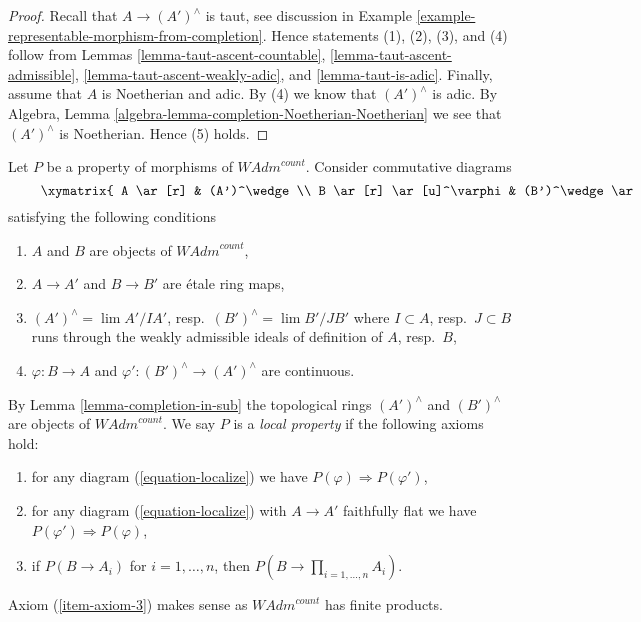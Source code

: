 \begin{proof}
Recall that $A \to (A')^\wedge$ is taut, see discussion in
Example \ref{example-representable-morphism-from-completion}.
Hence statements (1), (2), (3), and (4) follow from Lemmas
\ref{lemma-taut-ascent-countable},
\ref{lemma-taut-ascent-admissible},
\ref{lemma-taut-ascent-weakly-adic}, and
\ref{lemma-taut-is-adic}.
Finally, assume that $A$ is Noetherian and adic.
By (4) we know that $(A')^\wedge$ is adic.
By Algebra, Lemma \ref{algebra-lemma-completion-Noetherian-Noetherian}
we see that $(A')^\wedge$ is Noetherian. Hence (5) holds.
\end{proof}

\begin{situation}
\label{situation-local-property}
Let $P$ be a property of morphisms of $\textit{WAdm}^{count}$.
Consider commutative diagrams
\begin{equation}
\label{equation-localize}
\vcenter{
\xymatrix{
A \ar[r] & (A')^\wedge \\
B \ar[r] \ar[u]^\varphi & (B')^\wedge \ar[u]_{\varphi'}
}
}
\end{equation}
satisfying the following conditions
\begin{enumerate}
\item $A$ and $B$ are objects of $\textit{WAdm}^{count}$,
\item $A \to A'$ and $B \to B'$ are \'etale ring maps,
\item $(A')^\wedge = \lim A'/IA'$, resp.\  $(B')^\wedge = \lim B'/JB'$
where $I \subset A$, resp.\ $J \subset B$
runs through the weakly admissible ideals of definition of $A$, resp.\ $B$,
\item $\varphi : B \to A$ and $\varphi' : (B')^\wedge \to (A')^\wedge$
are continuous.
\end{enumerate}
By Lemma \ref{lemma-completion-in-sub} the topological rings
$(A')^\wedge$ and $(B')^\wedge$ are objects of $\textit{WAdm}^{count}$.
We say $P$ is a {\it local property} if the following axioms hold:
\begin{enumerate}
\item
\label{item-axiom-1}
for any diagram (\ref{equation-localize}) we have
$P(\varphi) \Rightarrow P(\varphi')$,
\item
\label{item-axiom-2}
for any diagram (\ref{equation-localize}) with $A \to A'$
faithfully flat we have
$P(\varphi') \Rightarrow P(\varphi)$,
\item
\label{item-axiom-3}
if $P(B \to A_i)$ for $i = 1, \ldots, n$, then
$P(B \to \prod_{i = 1, \ldots, n} A_i)$.
\end{enumerate}
Axiom (\ref{item-axiom-3})
makes sense as $\textit{WAdm}^{count}$ has finite products.
\end{situation}

